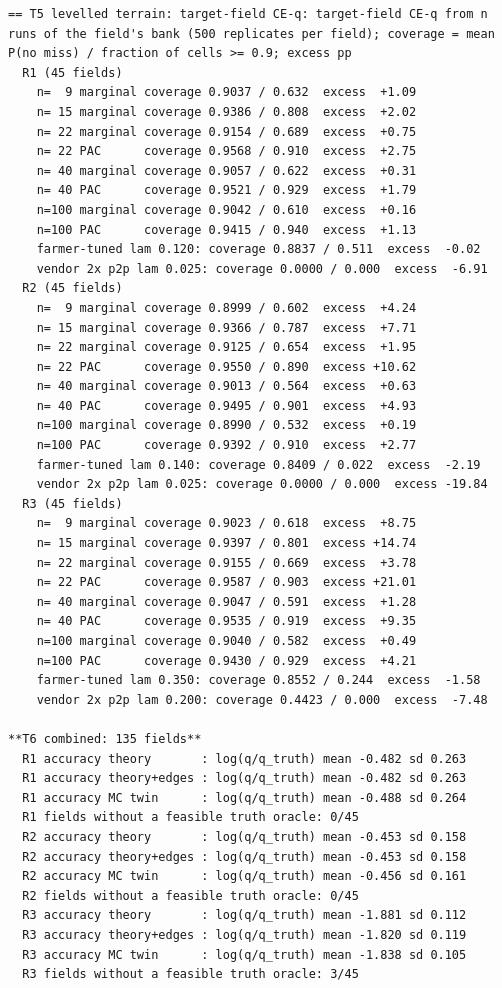 \documentclass[preprint,12pt,authoryear]{elsarticle}
\begin{document}
\begin{Verbatim}[fontsize=\tiny,breaklines]
== T5 levelled terrain: target-field CE-q: target-field CE-q from n runs of the field's bank (500 replicates per field); coverage = mean P(no miss) / fraction of cells >= 0.9; excess pp
  R1 (45 fields)
    n=  9 marginal coverage 0.9037 / 0.632  excess  +1.09
    n= 15 marginal coverage 0.9386 / 0.808  excess  +2.02
    n= 22 marginal coverage 0.9154 / 0.689  excess  +0.75
    n= 22 PAC      coverage 0.9568 / 0.910  excess  +2.75
    n= 40 marginal coverage 0.9057 / 0.622  excess  +0.31
    n= 40 PAC      coverage 0.9521 / 0.929  excess  +1.79
    n=100 marginal coverage 0.9042 / 0.610  excess  +0.16
    n=100 PAC      coverage 0.9415 / 0.940  excess  +1.13
    farmer-tuned lam 0.120: coverage 0.8837 / 0.511  excess  -0.02
    vendor 2x p2p lam 0.025: coverage 0.0000 / 0.000  excess  -6.91
  R2 (45 fields)
    n=  9 marginal coverage 0.8999 / 0.602  excess  +4.24
    n= 15 marginal coverage 0.9366 / 0.787  excess  +7.71
    n= 22 marginal coverage 0.9125 / 0.654  excess  +1.95
    n= 22 PAC      coverage 0.9550 / 0.890  excess +10.62
    n= 40 marginal coverage 0.9013 / 0.564  excess  +0.63
    n= 40 PAC      coverage 0.9495 / 0.901  excess  +4.93
    n=100 marginal coverage 0.8990 / 0.532  excess  +0.19
    n=100 PAC      coverage 0.9392 / 0.910  excess  +2.77
    farmer-tuned lam 0.140: coverage 0.8409 / 0.022  excess  -2.19
    vendor 2x p2p lam 0.025: coverage 0.0000 / 0.000  excess -19.84
  R3 (45 fields)
    n=  9 marginal coverage 0.9023 / 0.618  excess  +8.75
    n= 15 marginal coverage 0.9397 / 0.801  excess +14.74
    n= 22 marginal coverage 0.9155 / 0.669  excess  +3.78
    n= 22 PAC      coverage 0.9587 / 0.903  excess +21.01
    n= 40 marginal coverage 0.9047 / 0.591  excess  +1.28
    n= 40 PAC      coverage 0.9535 / 0.919  excess  +9.35
    n=100 marginal coverage 0.9040 / 0.582  excess  +0.49
    n=100 PAC      coverage 0.9430 / 0.929  excess  +4.21
    farmer-tuned lam 0.350: coverage 0.8552 / 0.244  excess  -1.58
    vendor 2x p2p lam 0.200: coverage 0.4423 / 0.000  excess  -7.48

**T6 combined: 135 fields**
  R1 accuracy theory       : log(q/q_truth) mean -0.482 sd 0.263
  R1 accuracy theory+edges : log(q/q_truth) mean -0.482 sd 0.263
  R1 accuracy MC twin      : log(q/q_truth) mean -0.488 sd 0.264
  R1 fields without a feasible truth oracle: 0/45
  R2 accuracy theory       : log(q/q_truth) mean -0.453 sd 0.158
  R2 accuracy theory+edges : log(q/q_truth) mean -0.453 sd 0.158
  R2 accuracy MC twin      : log(q/q_truth) mean -0.456 sd 0.161
  R2 fields without a feasible truth oracle: 0/45
  R3 accuracy theory       : log(q/q_truth) mean -1.881 sd 0.112
  R3 accuracy theory+edges : log(q/q_truth) mean -1.820 sd 0.119
  R3 accuracy MC twin      : log(q/q_truth) mean -1.838 sd 0.105
  R3 fields without a feasible truth oracle: 3/45


\end{Verbatim}
\end{document}
